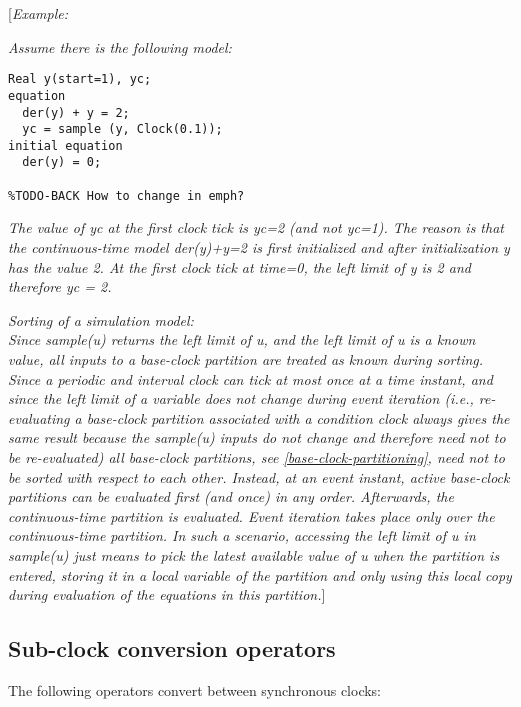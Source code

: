 {[}\emph{Example: }

\emph{Assume there is the following model:}

\begin{lstlisting}[language=modelica]
  Real y(start=1), yc;
equation
  der(y) + y = 2;
  yc = sample (y, Clock(0.1));
initial equation
  der(y) = 0;

%TODO-BACK How to change in emph?
\end{lstlisting}
\emph{The value of yc at the first clock tick is yc=2 (and not yc=1).
The reason is that the continuous-time model der(y)+y=2 is first
initialized and after initialization y has the value 2. At the first
clock tick at time=0, the left limit of y is 2 and therefore yc = 2.}

\emph{Sorting of a simulation model:\\
Since sample(u) returns the left limit of u, and the left limit of u is
a known value, all inputs to a base-clock partition are treated as known
during sorting. Since a periodic and interval clock can tick at most
once at a time instant, and since the left limit of a variable does not
change during event iteration (i.e., re-evaluating a base-clock
partition associated with a condition clock always gives the same result
because the sample(u) inputs do not change and therefore need not to be
re-evaluated) all base-clock partitions, see \autoref{base-clock-partitioning}, need
not to be sorted with respect to each other. Instead, at an event
instant, active base-clock partitions can be evaluated first (and once)
in any order. Afterwards, the continuous-time partition is evaluated.
Event iteration takes place only over the continuous-time partition. In
such a scenario, accessing the left limit of u in sample(u) just means
to pick the latest available value of u when the partition is entered,
storing it in a local variable of the partition and only using this
local copy during evaluation of the equations in this partition.}{]}

\subsection{Sub-clock conversion operators}

The following operators convert between synchronous clocks:

